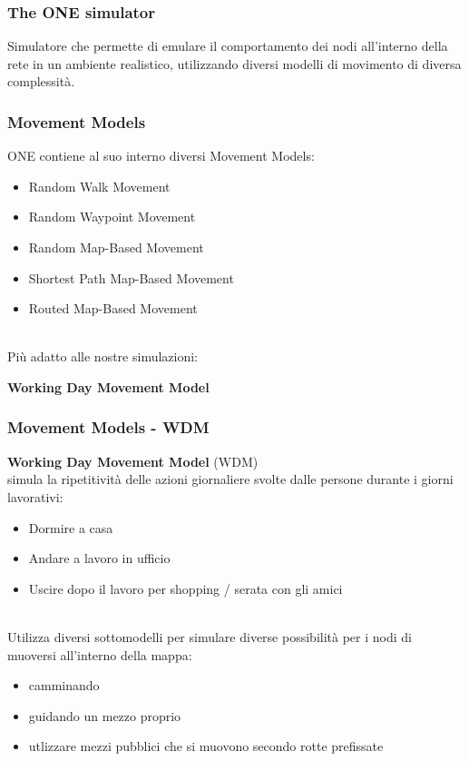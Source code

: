 \documentclass{beamer}
\begin{document}
\begin{frame}
\frametitle{The ONE simulator}
Simulatore che permette di emulare il comportamento dei nodi all'interno della rete in un  ambiente realistico, utilizzando diversi modelli di movimento di diversa complessità.
\end{frame}

\begin{frame}
\frametitle{Movement Models}
ONE contiene al suo interno diversi Movement Models:
\begin{itemize}
\item Random Walk Movement
\item Random Waypoint Movement
\pause
\item Random Map-Based Movement
\item Shortest Path Map-Based Movement
\item Routed Map-Based Movement
\end{itemize}
\ \\
\pause
Più adatto alle nostre simulazioni:
\begin{center}
\textbf{Working Day Movement Model}
\end{center}
\end{frame}

\begin{frame}
\frametitle{Movement Models - WDM}
\textbf{Working Day Movement Model} (WDM)\\
simula la ripetitività delle azioni giornaliere svolte dalle persone durante i giorni lavorativi:
\begin{itemize}
\item Dormire a casa
\item Andare a lavoro in ufficio
\item Uscire dopo il lavoro per shopping / serata con gli amici
\end{itemize}
\ \\
\pause
Utilizza diversi sottomodelli per simulare diverse possibilità per i nodi di muoversi all'interno della mappa:
\begin{itemize}
\item camminando
\item guidando un mezzo proprio
\item utlizzare mezzi pubblici che si muovono secondo rotte prefissate
\end{itemize}
\end{frame}
\end{document}

